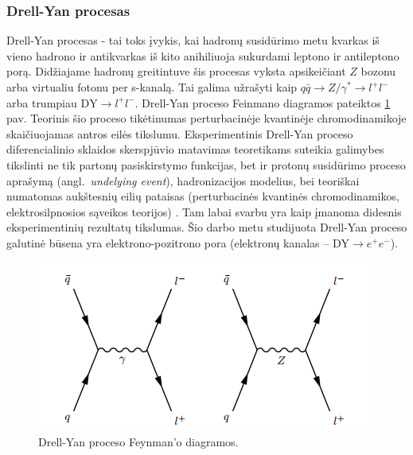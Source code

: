 \documentclass[a4paper, 12pt]{article}
\newlength\q
\begin{document}
\begin{centering}
\begin{minipage}[t]{0.48\linewidth}
\end{minipage}
\vspace{-0.3cm}
\end{centering}

\subsubsection{Drell-Yan procesas}
Drell-Yan procesas - tai toks įvykis, kai hadronų susidūrimo metu kvarkas iš vieno hadrono ir antikvarkas iš kito anihiliuoja sukurdami leptono ir antileptono porą. Didžiajame hadronų greitintuve šis procesas vyksta apsikeičiant $Z$ bozonu arba virtualiu fotonu per s-kanalą. Tai galima užrašyti kaip $q\bar{q} \! \rightarrow \! Z/ \gamma^{*} \! \rightarrow \! l^{+}l^{-}$ arba trumpiau $\mathrm{DY} \! \rightarrow \! l^{+}l^{-}$. Drell-Yan proceso Feinmano diagramos pateiktos \ref{fig:dyproc} pav. Teorinis šio proceso tikėtinumas perturbacinėje kvantinėje chromodinamikoje skaičiuojamas antros eilės tikslumu. Eksperimentinis Drell-Yan proceso diferencialinio sklaidos skerspjūvio matavimas teoretikams suteikia galimybes tikslinti ne tik partonų pasiskirstymo funkcijas, bet ir protonų susidūrimo proceso aprašymą (angl.\ \textit{undelying  event}), hadronizacijos modelius, bei teoriškai numatomas aukštesnių eilių pataisas (perturbacinės kvantinės chromodinamikos, elektrosilpnosios sąveikos teorijos) \cite{DY13TeV}. Tam labai svarbu yra kaip įmanoma didesnis eksperimentinių rezultatų tikslumas. Šio darbo metu studijuota Drell-Yan proceso galutinė būsena yra elektrono-pozitrono pora (elektronų kanalas -- $\mathrm{DY} \! \rightarrow \! e^{+}e^{-}$).

\begin{figure}[H]
\centering
\includegraphics[scale=0.75]{DYprocess.PNG}
\caption{Drell-Yan proceso Feynman'o diagramos.}
\label{fig:dyproc}
\end{figure}
\end{document}
